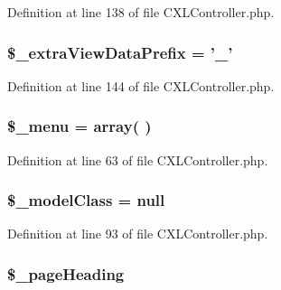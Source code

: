 Definition at line 138 of file CXLController.php.

\hypertarget{classCXLController_a41793f2872b496a2d4effc0da5f82a3c}{
\subsubsection[{\$\_\-extraViewDataPrefix}]{\setlength{\rightskip}{0pt plus 5cm}\$\_\-extraViewDataPrefix = '\_\-'}}
\label{classCXLController_a41793f2872b496a2d4effc0da5f82a3c}


Definition at line 144 of file CXLController.php.

\hypertarget{classCXLController_a4192f529627c76fa7a70ae23b9582516}{
\subsubsection[{\$\_\-menu}]{\setlength{\rightskip}{0pt plus 5cm}\$\_\-menu = array( )}}
\label{classCXLController_a4192f529627c76fa7a70ae23b9582516}


Definition at line 63 of file CXLController.php.

\hypertarget{classCXLController_a90080dcb26627bf719d96ab99e51f958}{
\subsubsection[{\$\_\-modelClass}]{\setlength{\rightskip}{0pt plus 5cm}\$\_\-modelClass = null}}
\label{classCXLController_a90080dcb26627bf719d96ab99e51f958}


Definition at line 93 of file CXLController.php.

\hypertarget{classCXLController_a4d69ce5758da90c27ff027a2a585b12d}{
\subsubsection[{\$\_\-pageHeading}]{\setlength{\rightskip}{0pt plus 5cm}\$\_\-pageHeading}}
\label{classCXLController_a4d69ce5758da90c27ff027a2a585b12d}


